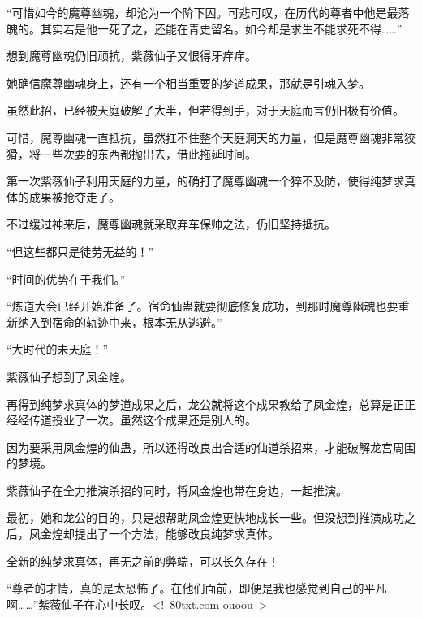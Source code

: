 \begin{this_body}
“可惜如今的魔尊幽魂，却沦为一个阶下囚。可悲可叹，在历代的尊者中他是最落魄的。其实若是他一死了之，还能在青史留名。如今却是求生不能求死不得……”

想到魔尊幽魂仍旧顽抗，紫薇仙子又恨得牙痒痒。

她确信魔尊幽魂身上，还有一个相当重要的梦道成果，那就是引魂入梦。

虽然此招，已经被天庭破解了大半，但若得到手，对于天庭而言仍旧极有价值。

可惜，魔尊幽魂一直抵抗，虽然扛不住整个天庭洞天的力量，但是魔尊幽魂非常狡猾，将一些次要的东西都抛出去，借此拖延时间。

第一次紫薇仙子利用天庭的力量，的确打了魔尊幽魂一个猝不及防，使得纯梦求真体的成果被抢夺走了。

不过缓过神来后，魔尊幽魂就采取弃车保帅之法，仍旧坚持抵抗。

“但这些都只是徒劳无益的！”

“时间的优势在于我们。”

“炼道大会已经开始准备了。宿命仙蛊就要彻底修复成功，到那时魔尊幽魂也要重新纳入到宿命的轨迹中来，根本无从逃避。”

“大时代的未天庭！”

紫薇仙子想到了凤金煌。

再得到纯梦求真体的梦道成果之后，龙公就将这个成果教给了凤金煌，总算是正正经经传道授业了一次。虽然这个成果还是别人的。

因为要采用凤金煌的仙蛊，所以还得改良出合适的仙道杀招来，才能破解龙宫周围的梦境。

紫薇仙子在全力推演杀招的同时，将凤金煌也带在身边，一起推演。

最初，她和龙公的目的，只是想帮助凤金煌更快地成长一些。但没想到推演成功之后，凤金煌却提出了一个方法，能够改良纯梦求真体。

全新的纯梦求真体，再无之前的弊端，可以长久存在！

“尊者的才情，真的是太恐怖了。在他们面前，即便是我也感觉到自己的平凡啊……”紫薇仙子在心中长叹。<!--80txt.com-ouoou-->

\end{this_body}

